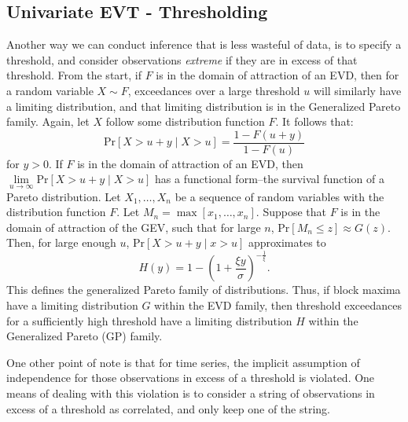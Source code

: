 \subsection{Univariate EVT - Thresholding}
Another way we can conduct inference that is less wasteful of data, is to specify a threshold,
  and consider observations \emph{extreme} if they are in excess of that threshold.  From the
  start, if $F$ is in the domain of attraction of an EVD, then for a random variable $X\sim F$,
  exceedances over a large threshold $u$ will similarly have a limiting distribution, and that
  limiting distribution is in the Generalized Pareto family.  Again, let $X$ follow some distribution
  function $F$. It follows that:
  \begin{equation*}
    \text{Pr}\left[X > u + y\mid X > u\right] = \frac{1 - F(u + y)}{1 - F(u)}
  \end{equation*}
  for $y > 0$.  If $F$ is in the domain of attraction of an EVD, then
  $\lim\limits_{u\to\infty}\text{Pr}\left[X > u + y\mid X > u\right]$
  has a functional form--the survival function of a Pareto distribution. Let $X_1,\ldots,X_n$ be a
  sequence of random variables with the distribution function $F$.  Let $M_n = \max[x_1,\ldots,x_n]$.
  Suppose that $F$ is in the domain of attraction of the GEV, such that for large $n$,
  $\text{Pr}[M_n \leq z]\approx G(z)$.  Then, for large enough $u$, $\text{Pr}[X > u+y\mid x > u]$
  approximates to
  \begin{equation*}
    \label{eqn:gp}
    H(y) = 1 - \left(1 + \frac{\xi y}{\sigma}\right)^{-\frac{1}{\xi}}.
  \end{equation*}
  This defines the generalized Pareto family of distributions.  Thus, if block maxima have a
  limiting distribution $G$ within the EVD family, then threshold exceedances for a sufficiently
  high threshold have a limiting distribution $H$ within the Generalized Pareto (GP) family.


One other point of note is that for time series, the implicit assumption of independence for those
  observations in excess of a threshold is violated.  One means of dealing with this violation is
  to consider a string of observations in excess of a threshold as correlated, and only keep one
  of the string.

